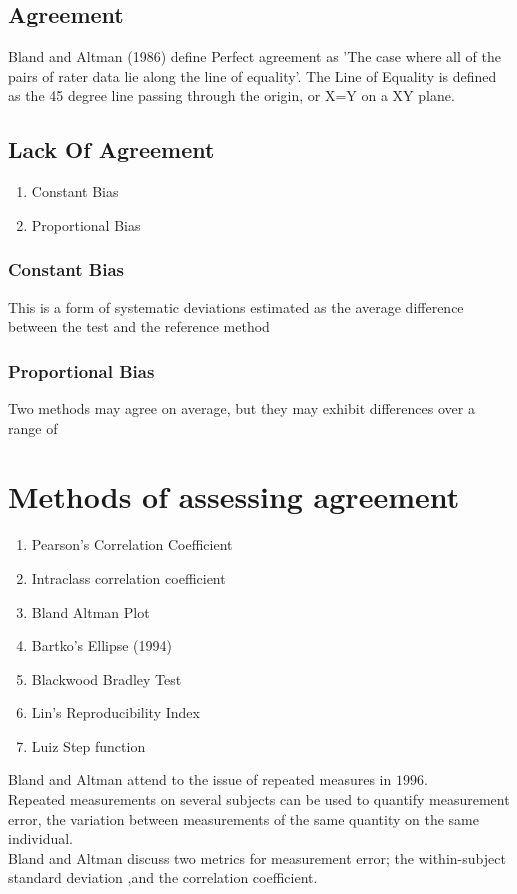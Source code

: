 \documentclass[12pt, a4paper]{report}
\theoremstyle{plain}
\theoremstyle{definition}
\theoremstyle{remark}
\begin{document}
	\subsection{Agreement} Bland and Altman (1986) define Perfect
	agreement as 'The case where all of the pairs of rater data lie
	along the line of equality'. The Line of Equality is defined as
	the 45 degree line passing through the origin, or X=Y on a XY
	plane.
	
	\subsection{Lack Of Agreement}
	\begin{enumerate}
		\item Constant Bias\item Proportional Bias
	\end{enumerate}
	
	\subsubsection*{Constant Bias} This is a form of systematic
	deviations estimated as the average difference between the test
	and the reference method
	
	
	\subsubsection*{Proportional Bias} Two methods may agree on
	average, but they may exhibit differences over a range of
	\section{Methods of assessing agreement}
	
	\begin{enumerate}
		\item Pearson's Correlation Coefficient\item Intraclass
		correlation coefficient \item Bland Altman Plot \item Bartko's
		Ellipse (1994) \item Blackwood Bradley Test \item Lin's
		Reproducibility Index \item Luiz Step function
	\end{enumerate}
	
	Bland and Altman attend to the issue of repeated measures in
	$1996$.
	\\
	Repeated measurements on several subjects can be used to quantify
	measurement error, the variation between measurements of the same
	quantity on the same individual.
	\\
	Bland and Altman discuss two metrics for measurement error; the
	within-subject standard deviation ,and the correlation
	coefficient.
	
\end{document}
